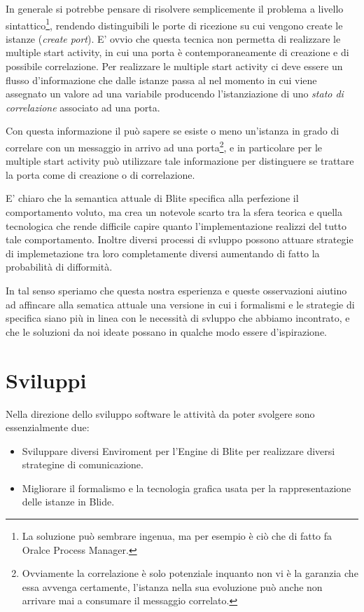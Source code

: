 In generale si potrebbe pensare di risolvere semplicemente il problema a livello
sintattico\footnote{La soluzione può sembrare ingenua, ma per esempio è ciò che
di fatto fa Oralce Process Manager.}, rendendo distinguibili le porte di
ricezione su cui vengono create le istanze (\emph{create port}). E' ovvio che questa tecnica non permetta di realizzare le multiple start
activity, in cui una porta è contemporaneamente di creazione e di possibile
correlazione. Per realizzare le multiple start activity ci deve essere un
flusso d'informazione che dalle istanze passa al  nel
momento in cui viene assegnato un valore ad una variabile producendo
l'istanziazione di uno \emph{stato di correlazione} associato ad una porta.

Con questa informazione il  può sapere se esiste o meno
un'istanza in grado di correlare con un messaggio in arrivo ad una
porta\footnote{Ovviamente la correlazione è solo potenziale inquanto non vi è
la garanzia che essa avvenga certamente, l'istanza nella sua evoluzione può
anche non arrivare mai a consumare il messaggio correlato.}, e in particolare
per le multiple start activity può utilizzare tale informazione per distinguere se trattare la porta come di creazione o di correlazione.

E' chiaro che la semantica attuale di Blite specifica alla perfezione il
comportamento voluto, ma crea un notevole scarto tra la sfera teorica e quella
tecnologica che rende difficile capire quanto l'implementazione realizzi del
tutto tale comportamento. Inoltre diversi processi di svluppo possono attuare
strategie di implemetazione tra loro completamente diversi aumentando di fatto
la probabilità di difformità.

In tal senso speriamo che questa nostra esperienza e queste osservazioni
aiutino ad affincare alla sematica attuale una versione in cui i formalismi e
le strategie di specifica siano più in linea con le necessità di svluppo che
abbiamo incontrato, e che le soluzioni da noi ideate possano in qualche modo
essere d'ispirazione.
  
\section{Sviluppi}

Nella direzione dello sviluppo software le attività da poter svolgere sono
essenzialmente due:

\begin{itemize}
  \item Sviluppare diversi Enviroment per l'Engine di Blite per realizzare
  diversi strategine di comunicazione.
  \item Migliorare il formalismo e la tecnologia grafica usata per la
  rappresentazione delle istanze in Blide.
\end{itemize} 

